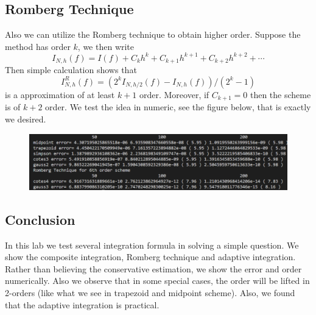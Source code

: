 \documentclass{article}
\begin{document}
\subsection{Romberg Technique}
Also we can utilize the Romberg technique to obtain higher order. Suppose the method has order $k$, we then write $$I_{N,h}(f) = I(f) + C_{k}h^k + C_{k+1}h^{k+1} + C_{k+2}h^{k+2} + \cdots$$
Then simple calculation shows that 
$$I_{N,h}^R(f) = (2^kI_{N,h/2}(f) - I_{N,h}(f))/(2^k - 1)$$ is a approximation of at least $k+1$ order. Moreover, if $C_{k+1}=0$ then the scheme is of $k+2$ order.
We test the idea in numeric, see the figure below, that is exactly we desired.
\begin{figure}[H]
	\includegraphics[scale=.4]{fig3.png}
\end{figure}


\subsection{Conclusion}
In this lab we test several integration formula in solving a simple question. We show the composite integration, Romberg technique and adaptive integration. Rather than believing the conservative estimation, we show the error and order numerically. Also we observe that in some special cases, the order will be lifted in 2-orders (like what we see in trapezoid and midpoint scheme). Also, we found that the adaptive integration is practical. 
\end{document}
